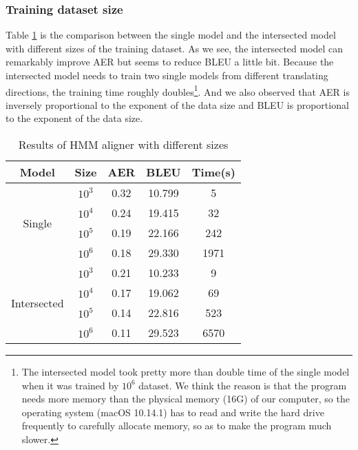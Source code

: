 \documentclass[11pt,a4paper]{article}
\begin{document}
\subsubsection{Training dataset size}
Table \ref{tab:hmm-size} is the comparison between the single model and the intersected model with different sizes of the training dataset. As we see, the intersected model can remarkably improve AER but seems to reduce BLEU a little bit. Because the intersected model needs to train two single models from different translating directions, the training time roughly doubles\footnote{The intersected model took pretty more than double time of the single model when it was trained by $10^6$ dataset. We think the reason is that the program needs more memory than the physical memory (16G) of our computer, so the operating system (macOS 10.14.1) has to read and write the hard drive frequently to carefully allocate memory, so as to make the program much slower.}. And we also observed that AER is inversely proportional to the exponent of the data size and BLEU is proportional to the exponent of the data size.
\begin{table}[h!]
  \begin{center}
  \begin{tabular}{|c|c|c|c|c|}
  \hline 
  \bf Model & \bf Size &\bf AER & \bf BLEU & \bf Time(s) \\ 
  \hline
  \multirow{4}{*}{Single} & $10^3$ & 0.32 & 10.799 & 5 \\
  \hhline{~----} & $10^4$ & 0.24 & 19.415 & 32 \\
  
  \hhline{~----} & $10^5$ & 0.19 & 22.166 & 242 \\
  
  \hhline{~----} & $10^6$ & 0.18 & 29.330 & 1971 \\
  \hline
  \multirow{4}{*}{Intersected} & $10^3$ & 0.21 & 10.233 & 9 \\
  \hhline{~----} & $10^4$ & 0.17 & 19.062 & 69 \\
  
  \hhline{~----} & $10^5$ & 0.14 & 22.816 & 523 \\
  
  \hhline{~----} & $10^6$ & 0.11 & 29.523 & 6570 \\
  \hline
  \end{tabular}
  \end{center}
  \caption{Results of HMM aligner with different sizes}
  \label{tab:hmm-size}
\end{table}
\end{document}
